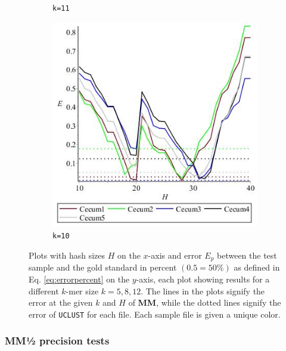 \documentclass[../../main.tex]{subfiles}
\begin{document}
\begin{figure}[H]
\begin{subfigure}[b]{.45\textwidth}
\caption{\texttt{k=11}}
\end{subfigure}
\begin{subfigure}[b]{.45\textwidth}
\includegraphics[width=\textwidth]{precision/minmax/k11cecum}
\caption{\texttt{k=10}}
\end{subfigure}
\caption{Plots with hash sizes $H$ on the $x$-axis and error $E_p$ between the test sample and the gold standard in percent $(0.5 = 50\%)$ as defined in Eq. \ref{eq:errorpercent} on the $y$-axis, each plot showing results for a different $k$-mer size $k=5,8,12$. The lines in the plots signify the error at the given $k$ and $H$ of {\bf MM}, while the dotted lines signify the error of \texttt{UCLUST} for each file. Each sample file is given a unique color.}
\label{fig:allKminmax}
\end{figure}

\subsubsection{MM½ precision tests}
\end{document}
